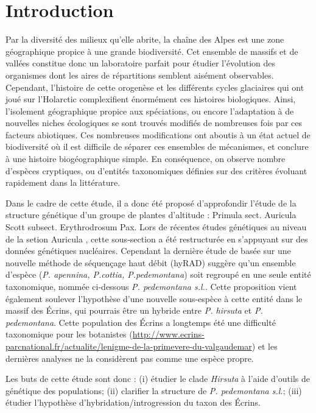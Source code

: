 \section{Introduction}

Par la diversité des milieux qu'elle abrite, la chaîne des Alpes est une zone géographique propice à une grande biodiversité.
 Cet ensemble de massifs et de vallées constitue donc un laboratoire parfait pour étudier l'évolution des organismes dont les aires de répartitions semblent aisément observables.
Cependant, l'histoire de cette orogenèse et les différents cycles glaciaires qui ont joué sur l'Holarctic complexifient énormément ces histoires biologiques.
 Ainsi, l'isolement géographique propice aux spéciations, ou encore l'adaptation à de nouvelles niches écologiques se sont trouvés modifiés de nombreuses fois par ces facteurs abiotiques.
 Ces nombreuses modifications ont aboutis à un état actuel de biodiversité où il est difficile de séparer ces ensembles de mécanismes, et conclure à une histoire biogéographique simple.
 En conséquence, on observe nombre d'espèces cryptiques, ou d'entités taxonomiques définies sur des critères évoluant rapidement dans la littérature.

Dans le cadre de cette étude, il a donc été proposé d'approfondir l'étude de la structure génétique d'un groupe de plantes d'altitude : Primula sect. Auricula Scott subsect. Erythrodrosum Pax.%
 Lors de récentes études génétiques au niveau de la setion Auricula \citep{Zhang2004,Zhang2004a, Boucher2016a}, cette sous-section a été restructurée en s'appuyant sur des données génétiques nucléaires.
 Cependant la dernière étude de \citet{Boucher2016a} basée sur une nouvelle méthode de séquençage haut débit (hyRAD) suggère qu'un ensemble d'espèce (\textit{P. apennina, P.cottia, P.pedemontana}) soit regroupé en une seule entité taxonomique, nommée ci-dessous \textit{P. pedemontana s.l.}.
 Cette proposition vient également soulever l'hypothèse d'une nouvelle sous-espèce à cette entité dans le massif des Écrins, qui pourrais être un hybride entre \textit{P. hirsuta} et \textit{P. pedemontana}.
 Cette population des Écrins a longtemps été une difficulté taxonomique pour les botanistes (\url{http://www.ecrins-parcnational.fr/actualite/lenigme-de-la-primevere-du-valgaudemar}) et les dernières analyses ne la considèrent pas comme une espèce propre.

Les buts de cette étude sont donc : (i) étudier le clade \textit{Hirsuta} à l'aide d'outils de génétique des populations; (ii) clarifier la structure de \textit{P. pedemontana s.l.}; (iii) étudier l'hypothèse d'hybridation/introgression du taxon des Écrins.

